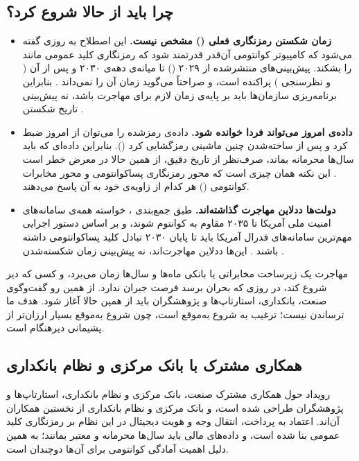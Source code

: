 \documentclass[a4paper,12pt]{article}
\begin{document}
	\subsection*{چرا باید از حالا شروع کرد؟}
	\begin{itemize}[rightmargin=0.5cm, itemsep=5pt]
		\item \textbf{زمان شکستن رمزنگاری فعلی () مشخص نیست.}
		این اصطلاح به روزی گفته می‌شود که کامپیوتر کوانتومی آن‌قدر قدرتمند شود که رمزنگاری کلید عمومی مانند  را بشکند.
		پیش‌بینی‌های منتشرشده از ۲۰۲۹ () تا میانه‌ی دهه‌ی ۲۰۳۰ و پس از آن ( و نظرسنجی ) پراکنده است،
		و  صراحتاً می‌گوید زمان آن را نمی‌داند \citep{qday-rsa}.
		بنابراین برنامه‌ریزی سازمان‌ها باید بر پایه‌ی زمان لازم برای مهاجرت باشد، نه پیش‌بینی تاریخ شکستن .

		\item \textbf{داده‌ی امروز می‌تواند فردا خوانده شود.}
		داده‌ی رمزشده را می‌توان از امروز ضبط کرد و پس از ساخته‌شدن چنین ماشینی رمزگشایی کرد
		(). بنابراین داده‌ای که باید سال‌ها محرمانه بماند، صرف‌نظر از تاریخ دقیق، از همین حالا در معرض خطر است \citep{qday-rsa}.
		این نکته همان چیزی است که محور رمزنگاری پساکوانتومی و محور مخابرات کوانتومی () هر کدام از زاویه‌ی خود به آن پاسخ می‌دهند.

		\item \textbf{دولت‌ها ددلاین مهاجرت گذاشته‌اند.}
		طبق جمع‌بندی ،  خواسته همه‌ی سامانه‌های امنیت ملی آمریکا تا ۲۰۳۵ مقاوم به کوانتوم شوند،
		و بر اساس دستور اجرایی  مهم‌ترین سامانه‌های فدرال آمریکا باید تا پایان ۲۰۳۰ تبادل کلید پساکوانتومی داشته باشند \citep{qday-deadlines}.
		این‌ها ددلاین مهاجرت‌اند، نه پیش‌بینی زمان شکسته‌شدن .
	\end{itemize}

	مهاجرت یک زیرساخت مخابراتی یا بانکی ماه‌ها و سال‌ها زمان می‌برد، و کسی که دیر شروع کند، در روزی که بحران برسد فرصت جبران ندارد.
	از همین رو گفت‌وگوی صنعت، بانکداری، استارتاپ‌ها و پژوهشگران باید از همین حالا آغاز شود.
	هدف ما ترساندن نیست؛ ترغیب به شروع به‌موقع است، چون شروع به‌موقع بسیار ارزان‌تر از پشیمانی دیرهنگام است.

	\subsection*{همکاری مشترک با بانک مرکزی و نظام بانکداری}
	رویداد حول همکاری مشترک صنعت، بانک مرکزی و نظام بانکداری، استارتاپ‌ها و پژوهشگران طراحی شده است، و بانک مرکزی و نظام بانکداری از نخستین همکاران آن‌اند.
	اعتماد به پرداخت، انتقال وجه و هویت دیجیتال در این نظام بر رمزنگاری کلید عمومی بنا شده است،
	و داده‌های مالی باید سال‌ها محرمانه و معتبر بمانند؛ به همین دلیل اهمیت آمادگی کوانتومی برای آن‌ها دوچندان است.
\end{document}
